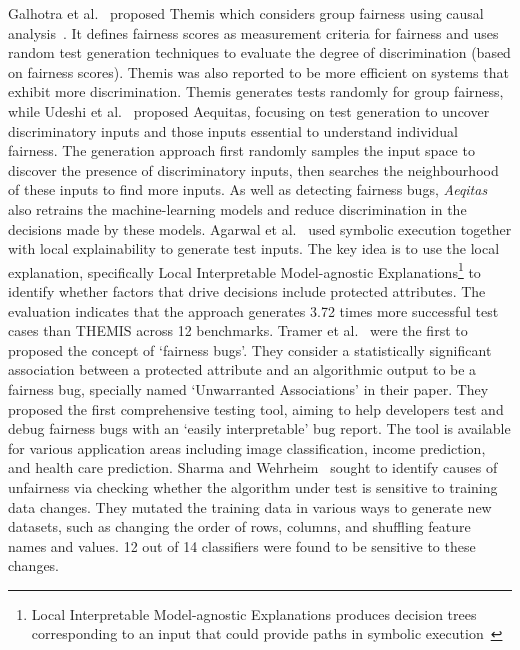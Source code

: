 Galhotra et al.~ proposed Themis which considers group fairness using causal analysis~.
It defines fairness scores as measurement criteria for fairness and uses random test generation techniques to evaluate the degree of discrimination (based on fairness scores).
Themis was also reported to be more efficient on systems that exhibit more discrimination.
Themis generates tests randomly for group fairness, while Udeshi et al.~ proposed Aequitas, focusing on test generation to uncover discriminatory inputs and those inputs essential to understand individual fairness.
The generation approach first randomly samples the input space to discover the presence of discriminatory inputs, then searches the neighbourhood of these inputs to find more inputs.
As well as detecting fairness bugs, \emph{Aeqitas} also retrains the machine-learning models and reduce discrimination in the decisions made by these models.
Agarwal et al.~ used symbolic execution together with local explainability to generate test inputs.
The key idea is to use the local explanation, specifically Local Interpretable
Model-agnostic Explanations\footnote{Local Interpretable
Model-agnostic Explanations produces decision trees corresponding to an input that could provide paths in symbolic execution~} to identify whether factors that drive decisions include protected attributes.
The evaluation indicates that the approach generates 3.72 times more successful test cases than THEMIS across 12 benchmarks.
Tramer et al.~ were the first to proposed the concept of `fairness bugs'.
They consider a statistically significant association between a protected attribute and an algorithmic output to be a fairness bug, specially named `Unwarranted Associations' in their paper.
They proposed the first comprehensive testing tool, aiming to help developers test and debug fairness bugs with an `easily interpretable' bug report.
The tool is available for various application areas including image classification, income prediction, and health care prediction.
Sharma and Wehrheim~ sought to identify causes of unfairness  via checking whether the algorithm under test is sensitive to training data changes.
They mutated the training data in various ways to generate new datasets, such as changing the order of rows, columns, and shuffling feature names and values.
12 out of 14 classifiers were found to be sensitive to these changes.

